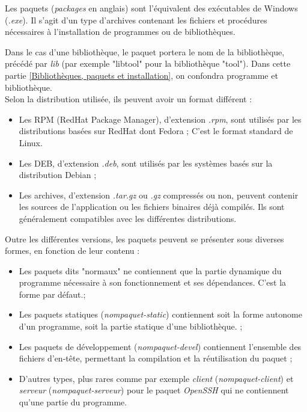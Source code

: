 Les paquets (\textit{packages} en anglais) sont l'équivalent des exécutables de Windows (\textit{.exe}).
Il s'agit d'un type d'archives contenant les fichiers et procédures nécessaires à l'installation de programmes ou de bibliothèques.

Dans le cas d'une bibliothèque, le paquet portera le nom de la bibliothèque, précédé par \textit{lib} (par exemple "libtool" pour la bibliothèque "tool").
Dans cette partie \ref{Bibliothèques, paquets et installation}, on confondra programme et bibliothèque.
\\


Selon la distribution utilisée, ils peuvent avoir un format différent :
\begin{itemize}
	\item Les RPM (RedHat Package Manager), d'extension \textit{.rpm}, sont utilisés par les distributions basées sur RedHat dont Fedora ;
C'est le format standard de Linux.
	\item Les DEB, d'extension \textit{.deb}, sont utilisés par les systèmes basés sur la distribution Debian ;
	\item Les archives, d'extension \textit{.tar.gz} ou \textit{.gz} compressés ou non, peuvent contenir les sources de l'application ou les fichiers binaires déjà compilés.
Ils sont généralement compatibles avec les différentes distributions.
\\
\end{itemize}


Outre les différentes versions, les paquets peuvent se présenter sous diverses formes, en fonction de leur contenu :
\begin{itemize}
	\item Les paquets dits "normaux" ne contiennent que la partie dynamique du programme nécessaire à son fonctionnement et ses dépendances.
C'est la forme par défaut.;
	\item Les paquets statiques (\textit{nompaquet-static}) contiennent soit la forme autonome d'un programme, soit la partie statique d'une bibliothèque. ;
	\item Les paquets de développement (\textit{nompaquet-devel}) contiennent l'ensemble des fichiers d'en-tête, permettant la compilation et la réutilisation du paquet ;
	\item D'autres types, plus rares comme par exemple \textit{client} (\textit{nompaquet-client}) et \textit{serveur} (\textit{nompaquet-serveur}) pour le paquet \textit{OpenSSH} qui ne contiennent qu'une partie du programme.
\\
\end{itemize}



